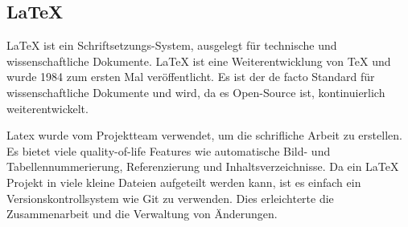 \subsection{\LaTeX{}}
\label{sec:latex}

\LaTeX{} ist ein Schriftsetzungs-System, ausgelegt für technische und wissenschaftliche Dokumente. \LaTeX{} ist eine Weiterentwicklung von \TeX{} und wurde 1984 zum ersten Mal veröffentlicht. Es ist der de facto Standard für wissenschaftliche Dokumente und wird, da es Open-Source ist, kontinuierlich weiterentwickelt. 

\bigskip

\noindent Latex wurde vom Projektteam verwendet, um die schrifliche Arbeit zu erstellen. Es bietet viele \gls{quality-of-life} Features wie automatische Bild- und Tabellennummerierung, Referenzierung und Inhaltsverzeichnisse. Da ein \LaTeX{} Projekt in viele kleine Dateien aufgeteilt werden kann, ist es einfach ein Versionskontrollsystem wie Git zu verwenden. Dies erleichterte die Zusammenarbeit und die Verwaltung von Änderungen.